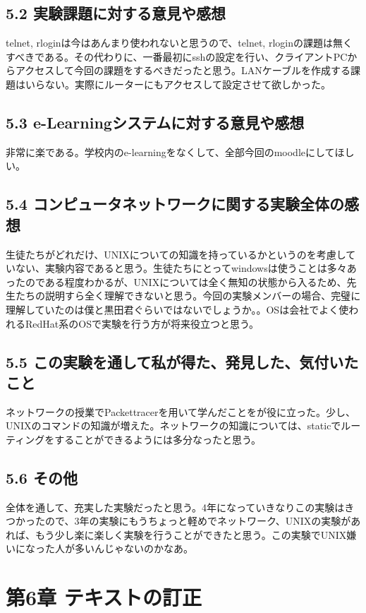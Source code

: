 \documentclass[12pt]{jreport}
\begin{document}
        \section*{5.2 実験課題に対する意見や感想}
            telnet, rloginは今はあんまり使われないと思うので、telnet, rloginの課題は無くすべきである。その代わりに、一番最初にsshの設定を行い、クライアントPCからアクセスして今回の課題をするべきだったと思う。LANケーブルを作成する課題はいらない。実際にルーターにもアクセスして設定させて欲しかった。
        \section*{5.3 e-Learningシステムに対する意見や感想}
            非常に楽である。学校内のe-learningをなくして、全部今回のmoodleにしてほしい。
        \section*{5.4 コンピュータネットワークに関する実験全体の感想}
            生徒たちがどれだけ、UNIXについての知識を持っているかというのを考慮していない、実験内容であると思う。生徒たちにとってwindowsは使うことは多々あったのである程度わかるが、UNIXについては全く無知の状態から入るため、先生たちの説明すら全く理解できないと思う。今回の実験メンバーの場合、完璧に理解していたのは僕と黒田君ぐらいではないでしょうか。。OSは会社でよく使われるRedHat系のOSで実験を行う方が将来役立つと思う。
        \section*{5.5 この実験を通して私が得た、発見した、気付いたこと}
            ネットワークの授業でPackettracerを用いて学んだことをが役に立った。少し、UNIXのコマンドの知識が増えた。ネットワークの知識については、staticでルーティングをすることができるようには多分なったと思う。
        \section*{5.6 その他}
            全体を通して、充実した実験だったと思う。4年になっていきなりこの実験はきつかったので、3年の実験にもうちょっと軽めでネットワーク、UNIXの実験があれば、もう少し楽に楽しく実験を行うことができたと思う。この実験でUNIX嫌いになった人が多いんじゃないのかなあ。
    \chapter*{第6章 テキストの訂正}
\end{document}
